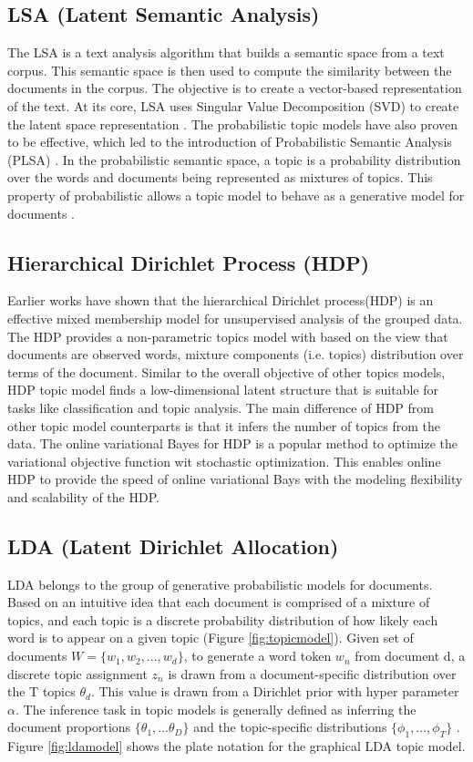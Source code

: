 \subsection{LSA (Latent Semantic Analysis)}
The LSA is a text analysis algorithm that builds a semantic space from a text corpus.  This semantic space is then used to compute the similarity between the documents in the corpus. The objective is to create a vector-based representation of the text. At its core, LSA uses Singular Value Decomposition (SVD) to create the latent space representation \cite{Deerwester}. The probabilistic topic models have also proven to be effective, which led to the introduction of Probabilistic Semantic Analysis (PLSA) \cite{Hofmann2001}. In the probabilistic semantic space, a topic is a probability distribution over the words and documents being represented as mixtures of topics. This property of probabilistic allows a topic model to behave as a generative model for documents \cite{Ocallaghan}. 


\subsection{Hierarchical Dirichlet Process (HDP)}
Earlier works have shown that the hierarchical Dirichlet process(HDP) is an effective mixed membership model for unsupervised analysis of the grouped data\cite{WhyeTeh2006}. The HDP provides a non-parametric topics model with based on the view that documents are observed words, mixture components (i.e. topics) distribution over terms of the document. Similar to the overall objective of other topics models, HDP topic model finds a low-dimensional latent structure that is suitable for tasks like classification and topic analysis. The main difference of HDP from other topic model counterparts is that it infers the number of topics from the data. The online variational Bayes for HDP \cite{pmlr-v15-wang11a} is a popular method to optimize the variational objective function wit stochastic optimization. This enables online HDP to provide the speed of online variational Bays with the modeling flexibility and scalability of the HDP.


\subsection{LDA (Latent Dirichlet Allocation)}
LDA belongs to the group of generative probabilistic models for documents. Based on an intuitive idea that each document is comprised of a mixture of topics, and each topic is a discrete probability distribution of how likely each word is to appear on a given topic (Figure \ref{fig:topicmodel}). Given set of documents $W = \{w_1, w_2, ...,  w_d\}$, to generate a word token $w_n$  from document d, a discrete topic assignment $z_n$ is drawn from a document-specific distribution over the T topics $\theta_d$. This value is drawn from a Dirichlet prior with hyper parameter $\alpha$. The inference task in topic models is generally defined as inferring the document proportions $\{\theta_1, ... \theta_D\}$ and the topic-specific distributions $\{\phi_1, ... ,  \phi_T\}$ \cite{Mimno}. Figure \ref{fig:ldamodel} shows the plate notation for the graphical LDA topic model.


